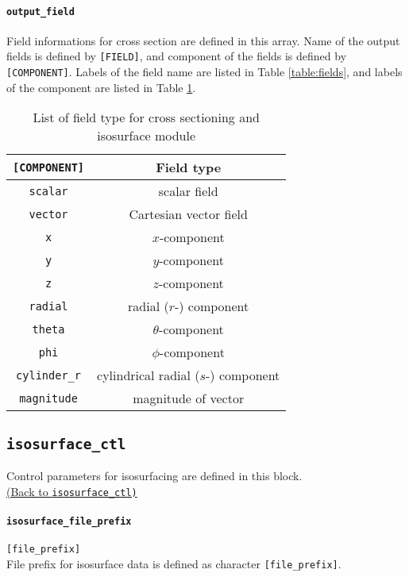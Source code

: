 %
\paragraph{\tt output\_field}
\label{href_t:psf_output_field}
Field informations for cross section are defined in this array. Name of the output fields is defined by \verb|[FIELD]|, and component of the fields is defined by \verb|[COMPONENT]|. Labels of the field name are listed in Table \ref{table:fields}, and labels of the component are listed in Table \ref{table:components}. \\
%
\begin{table}[htp]
\caption{List of field type for cross sectioning and isosurface module}
\label{table:components}
\begin{center} 
\begin{tabular}{|c|c|}
\hline
 \verb|[COMPONENT]| & Field type  \\ \hline \hline
 \verb|scalar| & scalar field  \\ \hline
 \verb|vector| & Cartesian vector field \\ \hline
 \verb|x| & $x$-component  \\ \hline
 \verb|y| & $y$-component  \\ \hline
 \verb|z| & $z$-component  \\ \hline
 \verb|radial| & radial ($r$-) component  \\ \hline
 \verb|theta| & $\theta$-component  \\ \hline
 \verb|phi| & $\phi$-component  \\ \hline
 \verb|cylinder_r| & cylindrical radial ($s$-) component  \\ \hline
 \verb|magnitude| & magnitude of vector  \\ \hline
\end{tabular}
\end{center}
\end{table}
%
%


\subsection{\tt isosurface\_ctl}
\label{href_t:isosurface_ctl}
Control parameters for isosurfacing are defined in this block. \\
\hyperref[href_i:isosurface_ctl]{(Back to {\tt isosurface\_ctl)}}

%
%
\paragraph{\tt isosurface\_file\_prefix}
\label{href_t:isosurface_file_prefix}
\verb|[file_prefix]| \\
File prefix for isosurface data is defined as character \verb|[file_prefix]|.

